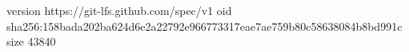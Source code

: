 version https://git-lfs.github.com/spec/v1
oid sha256:158bada202ba624d6e2a22792e966773317eae7ae759b80c58638084b8bd991c
size 43840
